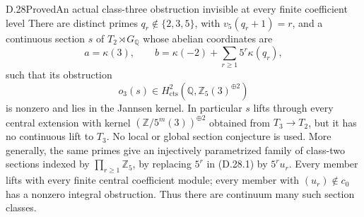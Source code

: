\begin{statement}{D.28}{Proved}{An actual class-three obstruction invisible at every finite coefficient level}
There are distinct primes \(q_r\notin\{2,3,5\}\),
with \(v_5(q_r+1)=r\), and a continuous
section \(s\) of \(T_2\rtimes G_{\mathbb Q}\)
whose abelian coordinates are
\[
 a=\kappa(3),\qquad
 b=\kappa(-2)+\sum_{r\ge1}5^r\kappa(q_r),        \tag{D.28.1}
\]
such that its obstruction
\[
  o_3(s)\in H^2_{\mathrm{cts}}
       (\mathbb Q,\mathbb Z_5(3)^{\oplus2})
\]
is nonzero and lies in the Jannsen kernel.
In particular \(s\) lifts through every
central extension with kernel
\((\mathbb Z/5^m(3))^{\oplus2}\) obtained
from \(T_3\to T_2\), but it has no
continuous lift to \(T_3\). No local or
global section conjecture is used.
More generally, the same primes give
an injectively parametrized family of
class-two sections indexed by
\(\prod_{r\ge1}\mathbb Z_5\), by replacing
\(5^r\) in (D.28.1) by \(5^ru_r\).
Every member lifts with every finite
central coefficient module; every member
with \((u_r)\notin c_0\) has a nonzero
integral obstruction. Thus there are
continuum many such section classes.
\end{statement}
